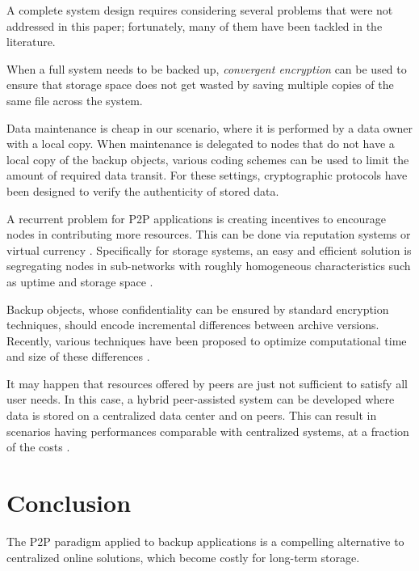 \documentclass[conference,10pt]{IEEEtran}
\begin{document}
A complete system design requires considering several problems that
were not addressed in this paper; fortunately, many of them have been
tackled in the literature.

When a full system needs to be backed up, \emph{convergent encryption}
\cite{cox02pastiche, 1021936} can be used to ensure that storage space
does not get wasted by saving multiple copies of the same file across
the system.

Data maintenance is cheap in our scenario, where it is performed by a
data owner with a local copy. When maintenance is delegated to nodes
that do not have a local copy of the backup objects, various coding
schemes can be used \cite{dimakis07,duminuco-biersack-08} to
limit the amount of required data transit. For these settings,
cryptographic protocols \cite{oualha2008security,
ateniese2008scalable} have been designed to verify the authenticity of
stored data.

A recurrent problem for P2P applications is
creating incentives to encourage nodes in contributing more
resources. This can be done via reputation
systems \cite{kamvar2003eigentrust} or virtual
currency \cite{vishnumurthy2003karma}. Specifically for storage
systems, an easy and efficient solution is segregating nodes in
sub-networks with roughly homogeneous characteristics such as uptime
and storage space \cite{Pamies-juarez_rewardingstability,
EURECOM+2738}.

Backup objects, whose confidentiality can be ensured by standard
encryption techniques, should encode incremental differences between
archive versions. Recently, various techniques have been proposed to
optimize computational time and size of these
differences \cite{Tangwongsan_efficientsimilarity}.

It may happen that resources offered by peers are just not sufficient
to satisfy all user needs. In this case, a hybrid peer-assisted system
can be developed where data is stored on a centralized data center and
on peers. This can result in scenarios having performances comparable
with centralized systems, at a fraction of the
costs \cite{EURECOM+3140}.



\section{Conclusion}

The P2P paradigm applied to backup applications is a compelling
alternative to centralized online solutions, which become costly
for long-term storage.
\end{document}
